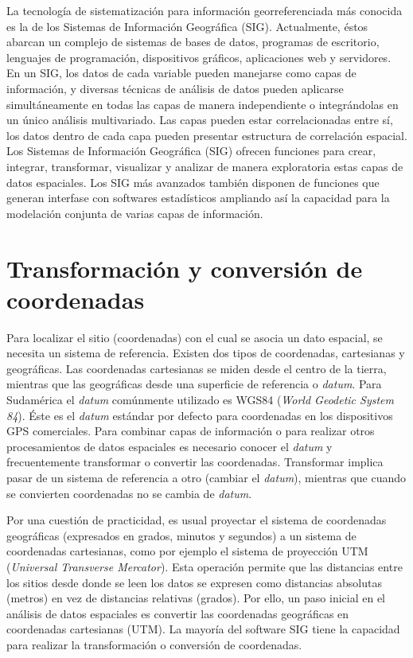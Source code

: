 \documentclass[11pt,b5paper,]{krantz}
\begin{document}
La tecnología de sistematización para información georreferenciada más conocida es la de los Sistemas de Información Geográfica (SIG). Actualmente, éstos abarcan un complejo de sistemas de bases de datos, programas de escritorio, lenguajes de programación, dispositivos gráficos, aplicaciones web y servidores. En un SIG, los datos de cada variable pueden manejarse como capas de información, y diversas técnicas de análisis de datos pueden aplicarse simultáneamente en todas las capas de manera independiente o integrándolas en un único análisis multivariado. Las capas pueden estar correlacionadas entre sí, los datos dentro de cada capa pueden presentar estructura de correlación espacial. Los Sistemas de Información Geográfica (SIG) ofrecen funciones para crear, integrar, transformar, visualizar y analizar de manera exploratoria estas capas de datos espaciales. Los SIG más avanzados también disponen de funciones que generan interfase con softwares estadísticos ampliando así la capacidad para la modelación conjunta de varias capas de información.

\hypertarget{transformaciuxf3n-y-conversiuxf3n-de-coordenadas}{%
\section{Transformación y conversión de coordenadas}\label{transformaciuxf3n-y-conversiuxf3n-de-coordenadas}}

Para localizar el sitio (coordenadas) con el cual se asocia un dato espacial, se necesita un sistema de referencia. Existen dos tipos de coordenadas, cartesianas y geográficas. Las coordenadas cartesianas se miden desde el centro de la tierra, mientras que las geográficas desde una superficie de referencia o \emph{datum}. Para Sudamérica el \emph{datum} comúnmente utilizado es WGS84 (\emph{World Geodetic System 84}). Éste es el \emph{datum} estándar por defecto para coordenadas en los dispositivos GPS comerciales. Para combinar capas de información o para realizar otros procesamientos de datos espaciales es necesario conocer el \emph{datum} y frecuentemente transformar o convertir las coordenadas. Transformar implica pasar de un sistema de referencia a otro (cambiar el \emph{datum}), mientras que cuando se convierten coordenadas no se cambia de \emph{datum}.

Por una cuestión de practicidad, es usual proyectar el sistema de coordenadas geográficas (expresados en grados, minutos y segundos) a un sistema de coordenadas cartesianas, como por ejemplo el sistema de proyección UTM (\emph{Universal Transverse Mercator}). Esta operación permite que las distancias entre los sitios desde donde se leen los datos se expresen como distancias absolutas (metros) en vez de distancias relativas (grados). Por ello, un paso inicial en el análisis de datos espaciales es convertir las coordenadas geográficas en coordenadas cartesianas (UTM). La mayoría del software SIG tiene la capacidad para realizar la transformación o conversión de coordenadas.
\end{document}

